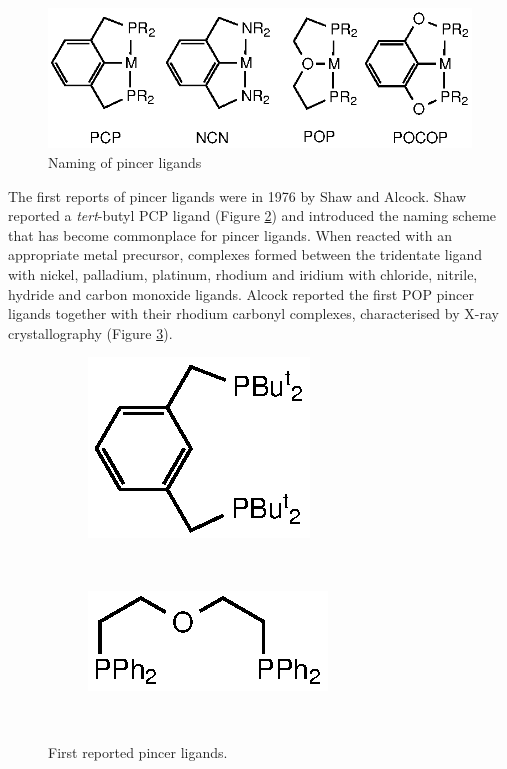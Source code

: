 \begin{figure}[ht]
\centering
\includegraphics[]{../Figures/Pincernaming.eps}
\caption[Naming of pincer ligands]{Naming of pincer ligands}
\label{Pincernaming}
\end{figure}

The first reports of pincer ligands were in 1976 by Shaw and Alcock.\cite{Moulton1976, Alcock1976}  Shaw reported a \emph{tert}-butyl PCP ligand (Figure \ref{ShawPCP}) and introduced the naming scheme that has become commonplace for pincer ligands.  When reacted with an appropriate metal precursor, complexes formed between the tridentate ligand with nickel, palladium, platinum, rhodium and iridium with chloride, nitrile, hydride and carbon monoxide ligands.\cite{Moulton1976}  Alcock reported the first POP pincer ligands together with their rhodium carbonyl complexes, characterised by X-ray crystallography (Figure \ref{AlcockPOP}).\cite{Alcock1976}  

\begin{figure}[htbp]
\centering
\begin{subfigure}[b]{0.3\textwidth}
	\centering
	\includegraphics{../Figures/Shaw.eps}
	\caption{}
	\label{ShawPCP}
\end{subfigure}
~
\begin{subfigure}[b]{0.3\textwidth}
	\centering
	\includegraphics{../Figures/Alcock.eps}
	\caption{}
	\label{AlcockPOP}
\end{subfigure}
\\
\caption[First reported pincer ligands]{First reported pincer ligands.}
\label{Pincerligands}
\end{figure}

